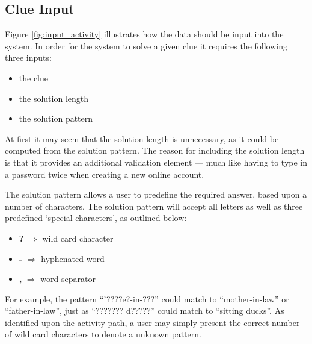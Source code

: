 \subsection{Clue Input} 
\label{sub:input}

Figure \ref{fig:input_activity} illustrates how the data should be input into 
the system. In order for the system to solve a given clue it requires the 
following three inputs:

\begin{itemize}
  \item the clue 
  \item the solution length
  \item the solution pattern
\end{itemize}

At first it may seem that the solution length is unnecessary, as it could be 
computed from the solution pattern. The reason for including the solution length
is that it provides an additional validation element --- much like having to 
type in a password twice when creating a new online account.

The solution pattern allows a user to predefine the required answer, based upon 
a number of characters. The solution pattern will accept all letters as well as 
three predefined `special characters', as outlined below:

\begin{itemize}
  \item[] \textbf{?} $\Rightarrow$ wild card character
  \item[] \textbf{-} $\Rightarrow$ hyphenated word 
  \item[] \textbf{,} $\Rightarrow$ word separator
\end{itemize}

For example, the pattern ``'????e?-in-???'' could match to ``mother-in-law'' or 
``father-in-law'', just as ``??????? d?????'' could match to ``sitting ducks''.
As identified upon the activity path, a user may simply present the correct 
number of wild card characters to denote a unknown pattern.

